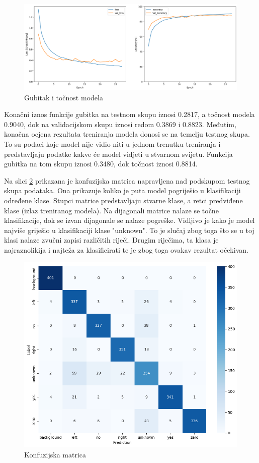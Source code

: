 \begin{figure}[htb]
    \centering
    \includegraphics[width=1\linewidth]{Chapters/neuronska_mreza/trening/acc.png} 
    \caption{Gubitak i točnost modela}
    \label{pic:accuracy}
\end{figure}

Konačni iznos funkcije gubitka na testnom skupu iznosi 0.2817, a točnost modela 0.9040, dok
na validacijskom skupu iznosi redom 0.3869 i 0.8823. Međutim, konačna ocjena rezultata
treniranja modela donosi se na temelju testnog skupa. To su podaci koje model nije vidio
niti u jednom trenutku treniranja i predstavljaju podatke kakve će model vidjeti u stvarnom
svijetu. Funkcija gubitka na tom skupu iznosi 0.3480, dok točnost iznosi 0.8814.

Na slici \ref{pic:confmtrx} prikazana je konfuzijska matrica napravljena nad podskupom
testnog skupa podataka. Ona prikazuje koliko je puta model pogriješio u klasifikaciji
određene klase. Stupci matrice predstavljaju stvarne klase, a retci predviđene klase
(izlaz treniranog modela). Na dijagonali matrice nalaze se točne klasifikacije, dok
se izvan dijagonale se nalaze pogreške. Vidljivo je kako je model najviše griješio
u klasifikaciji klase "unknown". To je slučaj zbog toga što se u toj klasi nalaze
zvučni zapisi različitih riječi. Drugim riječima, ta klasa je najraznolikija i najteža
za klasificirati te je zbog toga ovakav rezultat očekivan.

\begin{figure}[htb]
    \centering
    \includegraphics[width=0.7\linewidth]{Chapters/neuronska_mreza/trening/image.png} 
    \caption{Konfuzijska matrica}
    \label{pic:confmtrx}
\end{figure}

